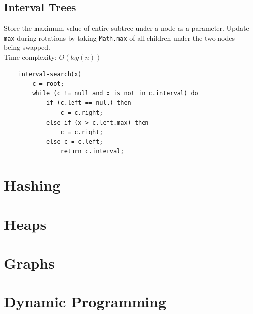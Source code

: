 \documentclass[10pt,landscape,a4paper]{article}
\begin{document}
\begin{multicols*}{4}
\subsection{Interval Trees}
Store the maximum value of entire subtree under a node as a parameter. Update \texttt{max} during rotations by taking \texttt{Math.max} of all children under the two nodes being swapped. \\
Time complexity: $O(log(n))$ \\
\begin{lstlisting}
    interval-search(x)
        c = root;
        while (c != null and x is not in c.interval) do
            if (c.left == null) then
                c = c.right;
            else if (x > c.left.max) then
                c = c.right;
            else c = c.left;
                return c.interval;
\end{lstlisting}

\section{Hashing}

\section{Heaps}

\section{Graphs}

\section{Dynamic Programming}
%
%
%
\end{multicols*}
\end{document}
